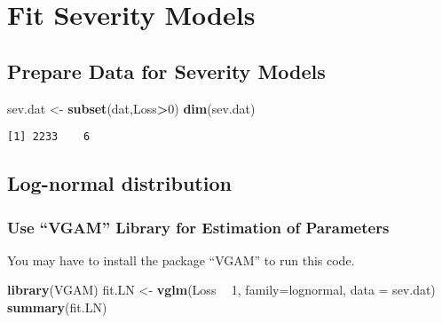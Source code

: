 \documentclass[]{book}
\newenvironment{Shaded}{\begin{snugshade}}{\end{snugshade}}
\newcommand{\KeywordTok}[1]{\textcolor[rgb]{0.13,0.29,0.53}{\textbf{#1}}}
\newcommand{\DataTypeTok}[1]{\textcolor[rgb]{0.13,0.29,0.53}{#1}}
\newcommand{\DecValTok}[1]{\textcolor[rgb]{0.00,0.00,0.81}{#1}}
\newcommand{\StringTok}[1]{\textcolor[rgb]{0.31,0.60,0.02}{#1}}
\newcommand{\OperatorTok}[1]{\textcolor[rgb]{0.81,0.36,0.00}{\textbf{#1}}}
\newcommand{\NormalTok}[1]{#1}
\theoremstyle{definition}
\theoremstyle{definition}
\theoremstyle{definition}
\theoremstyle{remark}
\begin{document}
\section{Fit Severity Models}\label{fit-severity-models}

\subsection{Prepare Data for Severity
Models}\label{prepare-data-for-severity-models}

\begin{Shaded}
\begin{Highlighting}[]
\NormalTok{sev.dat <-}\StringTok{ }\KeywordTok{subset}\NormalTok{(dat,Loss}\OperatorTok{>}\DecValTok{0}\NormalTok{)}
\KeywordTok{dim}\NormalTok{(sev.dat)}
\end{Highlighting}
\end{Shaded}

\begin{verbatim}
[1] 2233    6
\end{verbatim}

\subsection{Log-normal distribution}\label{log-normal-distribution}

\subsubsection{\texorpdfstring{Use ``VGAM'' Library for Estimation of
Parameters}{Use VGAM Library for Estimation of Parameters}}\label{use-vgam-library-for-estimation-of-parameters}

You may have to install the package ``VGAM'' to run this code.

\begin{Shaded}
\begin{Highlighting}[]
\KeywordTok{library}\NormalTok{(VGAM)}
\NormalTok{fit.LN <-}\StringTok{ }\KeywordTok{vglm}\NormalTok{(Loss }\OperatorTok{~}\StringTok{ }\DecValTok{1}\NormalTok{, }\DataTypeTok{family=}\NormalTok{lognormal, }\DataTypeTok{data =}\NormalTok{ sev.dat)}
\KeywordTok{summary}\NormalTok{(fit.LN)}
\end{Highlighting}
\end{Shaded}
\end{document}
